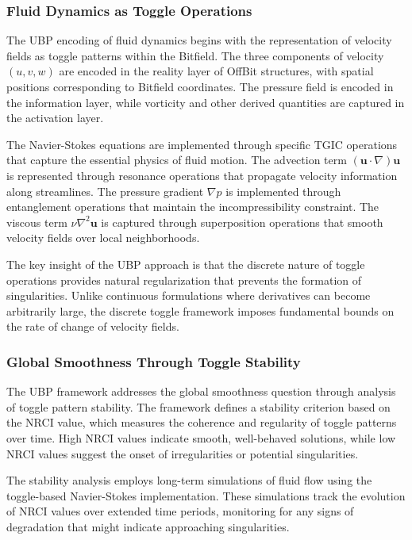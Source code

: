 \documentclass[11pt]{amsart}
\begin{document}
\subsubsection{Fluid Dynamics as Toggle Operations}

The UBP encoding of fluid dynamics begins with the representation of velocity fields as toggle patterns within the Bitfield. The three components of velocity $(u, v, w)$ are encoded in the reality layer of OffBit structures, with spatial positions corresponding to Bitfield coordinates. The pressure field is encoded in the information layer, while vorticity and other derived quantities are captured in the activation layer.

The Navier-Stokes equations are implemented through specific TGIC operations that capture the essential physics of fluid motion. The advection term $(\mathbf{u} \cdot \nabla)\mathbf{u}$ is represented through resonance operations that propagate velocity information along streamlines. The pressure gradient $\nabla p$ is implemented through entanglement operations that maintain the incompressibility constraint. The viscous term $\nu \nabla^2 \mathbf{u}$ is captured through superposition operations that smooth velocity fields over local neighborhoods.

The key insight of the UBP approach is that the discrete nature of toggle operations provides natural regularization that prevents the formation of singularities. Unlike continuous formulations where derivatives can become arbitrarily large, the discrete toggle framework imposes fundamental bounds on the rate of change of velocity fields.

\subsubsection{Global Smoothness Through Toggle Stability}

The UBP framework addresses the global smoothness question through analysis of toggle pattern stability. The framework defines a stability criterion based on the NRCI value, which measures the coherence and regularity of toggle patterns over time. High NRCI values indicate smooth, well-behaved solutions, while low NRCI values suggest the onset of irregularities or potential singularities.

The stability analysis employs long-term simulations of fluid flow using the toggle-based Navier-Stokes implementation. These simulations track the evolution of NRCI values over extended time periods, monitoring for any signs of degradation that might indicate approaching singularities.
\end{document}
